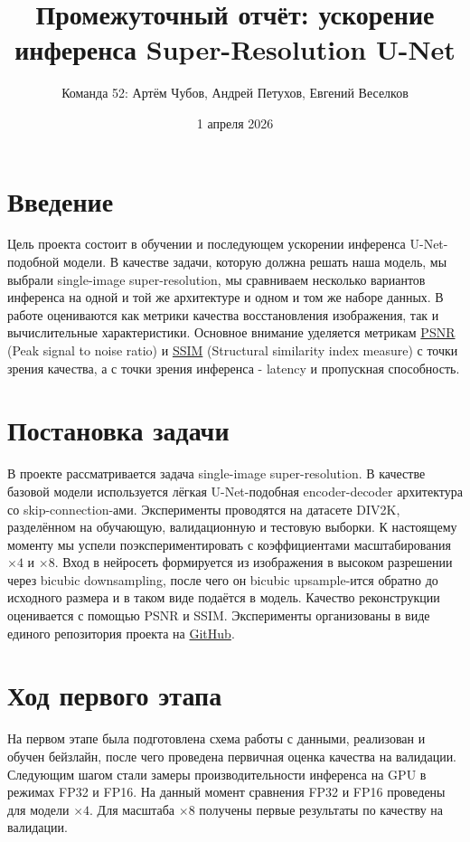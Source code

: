 \documentclass[12pt,a4paper]{article}
\title{Промежуточный отчёт: ускорение инференса Super-Resolution U-Net}
\author{Команда 52: Артём Чубов, Андрей Петухов, Евгений Веселков}
\date{1 апреля 2026}
\begin{document}
\maketitle

\section{Введение}
Цель проекта состоит в обучении и последующем ускорении инференса U-Net-подобной модели. В качестве задачи, которую должна решать наша модель, мы выбрали single-image super-resolution, мы сравниваем несколько вариантов инференса на одной и той же архитектуре и одном и том же наборе данных. В работе оцениваются как метрики качества восстановления изображения, так и вычислительные характеристики. Основное внимание уделяется метрикам \href{https://en.wikipedia.org/wiki/Peak_signal-to-noise_ratio}{PSNR} (Peak signal to noise ratio) и \href{https://en.wikipedia.org/wiki/Structural_similarity_index_measure}{SSIM} (Structural similarity index measure) с точки зрения качества, а с точки зрения инференса - latency и пропускная способность.

\section{Постановка задачи}
В проекте рассматривается задача single-image super-resolution. В качестве базовой модели используется лёгкая U-Net-подобная encoder-decoder архитектура со skip-connection-ами. Эксперименты проводятся на датасете DIV2K, разделённом на обучающую, валидационную и тестовую выборки. К настоящему моменту мы успели поэкспериментировать с коэффициентами масштабирования $\times 4$ и $\times 8$. Вход в нейросеть формируется из изображения в высоком разрешении через bicubic downsampling, после чего он bicubic upsample-ится обратно до исходного размера и в таком виде подаётся в модель. Качество реконструкции оценивается с помощью PSNR и SSIM. Эксперименты организованы в виде единого репозитория проекта на \href{https://github.com/aapetukhov/efml-unet}{GitHub}.

\section{Ход первого этапа}
На первом этапе была подготовлена схема работы с данными, реализован и обучен бейзлайн, после чего проведена первичная оценка качества на валидации. Следующим шагом стали замеры производительности инференса на GPU в режимах FP32 и FP16. На данный момент сравнения FP32 и FP16 проведены для модели $\times 4$. Для масштаба $\times 8$ получены первые результаты по качеству на валидации.
\end{document}
